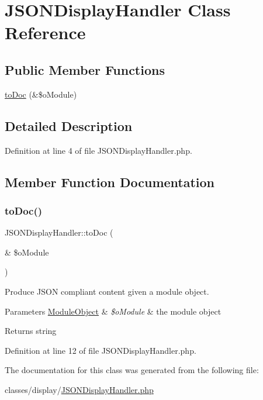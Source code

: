 \hypertarget{classJSONDisplayHandler}{}\section{J\+S\+O\+N\+Display\+Handler Class Reference}
\label{classJSONDisplayHandler}
\subsection*{Public Member Functions}
\begin{DoxyCompactItemize}
\item 
\hyperlink{classJSONDisplayHandler_aa2009f11e58e7c8206c9694d6d8b9ecf}{to\+Doc} (\&\$o\+Module)
\end{DoxyCompactItemize}


\subsection{Detailed Description}


Definition at line 4 of file J\+S\+O\+N\+Display\+Handler.\+php.



\subsection{Member Function Documentation}
\mbox{\label{classJSONDisplayHandler_aa2009f11e58e7c8206c9694d6d8b9ecf}} 
\subsubsection{\texorpdfstring{to\+Doc()}{toDoc()}}
{\footnotesize\ttfamily J\+S\+O\+N\+Display\+Handler\+::to\+Doc (\begin{DoxyParamCaption}\item[{\&}]{\$o\+Module }\end{DoxyParamCaption})}

Produce J\+S\+ON compliant content given a module object.~\newline

\begin{DoxyParams}[1]{Parameters}
\hyperlink{classModuleObject}{Module\+Object} & {\em \$o\+Module} & the module object \\
\hline
\end{DoxyParams}
\begin{DoxyReturn}{Returns}
string 
\end{DoxyReturn}


Definition at line 12 of file J\+S\+O\+N\+Display\+Handler.\+php.



The documentation for this class was generated from the following file\+:\begin{DoxyCompactItemize}
\item 
classes/display/\hyperlink{JSONDisplayHandler_8php}{J\+S\+O\+N\+Display\+Handler.\+php}\end{DoxyCompactItemize}

